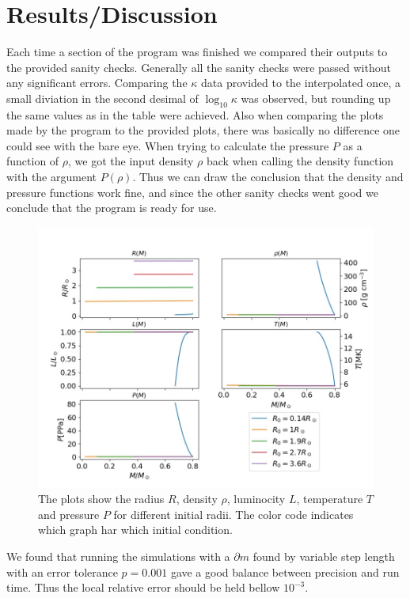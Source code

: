 \documentclass{emulateapj}
\begin{document}
	\section*{Results/Discussion}
	Each time a section of the program was finished we compared their outputs to the provided sanity checks. Generally all the sanity checks were passed without any significant errors. Comparing the $\kappa$ data provided to the interpolated once, a small diviation in the second desimal of $\log_{10}\kappa$ was observed, but rounding up the same values as in the table were achieved. Also when comparing the plots made by the program to the provided plots, there was basically no difference one could see with the bare eye. When trying to calculate the pressure $P$ as a function of $\rho$, we got the input density $\rho$ back when calling the density function with the argument $P(\rho)$. Thus we can draw the conclusion that the density and pressure functions work fine, and since the other sanity checks went good we conclude that the program is ready for use.
	\begin{figure}
		\includegraphics[width = \textwidth]{RadPlot.jpg}
		\caption{The plots show the radius $R$, density $\rho$, luminocity $L$, temperature $T$ and pressure $P$ for different initial radii. The color code indicates which graph har which initial condition.}
		\label{fig:rad}	
	\end{figure}

	We found that running the simulations with a $\partial m$ found by variable step length with an error tolerance $p = 0.001$ gave a good balance between precision and run time. Thus the local relative error should be held bellow $10^{-3}$.
	
\end{document}
